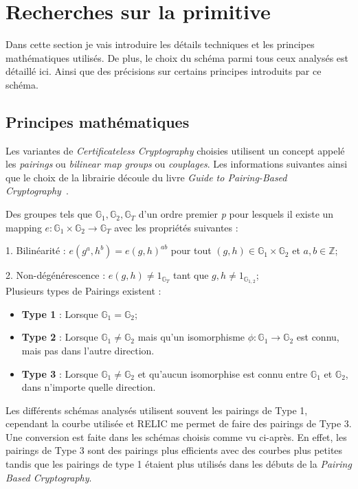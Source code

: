 \section{Recherches sur la primitive}
\label{sec:primitiveSearch}
Dans cette section je vais introduire les détails techniques et les principes mathématiques utilisés. De plus, le choix du schéma parmi tous ceux analysés est détaillé ici. Ainsi que des précisions sur certains principes introduits par ce schéma.
\subsection{Principes mathématiques}
\label{subsec:mathPairings}
Les variantes de \textit{Certificateless Cryptography} choisies utilisent un concept appelé les \textit{pairings} ou \textit{bilinear map groups} ou \textit{couplages}. Les informations suivantes ainsi que le choix de la librairie découle du livre \textit{Guide to Pairing-Based Cryptography}~\cite{bookPairing}.

Des groupes tels que $\mathbb{G}_1, \mathbb{G}_2, \mathbb{G}_T$ d'un ordre premier \textit{p} pour lesquels il existe un mapping $e : \mathbb{G}_1 \times \mathbb{G}_2 \rightarrow \mathbb{G}_T$ avec les propriétés suivantes :

1. Bilinéarité : $e(g^a, h^b) = e(g, h)^{ab}$ pour tout $(g,h) \in \mathbb{G}_1 \times \mathbb{G}_2$ et $a,b \in \mathbb{Z}$;

2. Non-dégénérescence : $e(g,h) \neq 1_{\mathbb{G}_T} $ tant que $g,h \neq 1_{\mathbb{G}_{1,2}}$;\\
Plusieurs types de Pairings existent :

\begin{itemize}
	\item \textbf{Type 1} : Lorsque $\mathbb{G}_1 = \mathbb{G}_2$;
	\item \textbf{Type 2} : Lorsque $\mathbb{G}_1 \ne \mathbb{G}_2$ mais qu'un isomorphisme $\phi : \mathbb{G}_1 \rightarrow \mathbb{G}_2$ est connu, mais pas dans l'autre direction.
	\item \textbf{Type 3} : Lorsque $\mathbb{G}_1 \ne \mathbb{G}_2$ et qu'aucun isomorphise est connu entre $\mathbb{G}_1$ et $\mathbb{G}_2$, dans n'importe quelle direction.
\end{itemize}
Les différents schémas analysés utilisent souvent les pairings de Type 1, cependant la courbe utilisée et RELIC me permet de faire des pairings de Type 3. Une conversion est faite dans les schémas choisis comme vu ci-après. En effet, les pairings de Type 3 sont des pairings plus efficients avec des courbes plus petites tandis que les pairings de type 1 étaient plus utilisés dans les débuts de la \textit{Pairing Based Cryptography}.
